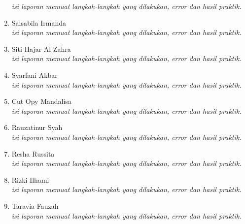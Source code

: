 \documentclass[a4paper]{tufte-handout}
\begin{document}
\begin{enumerate}
\textit{isi laporan memuat langkah-langkah yang dilakukan, error dan hasil praktik.}
\item Salsabila Irmanda		\\
\textit{isi laporan memuat langkah-langkah yang dilakukan, error dan hasil praktik.}
\item Siti Hajar Al Zahra	\\
\textit{isi laporan memuat langkah-langkah yang dilakukan, error dan hasil praktik.}
\item Syarfani Akbar		\\
\textit{isi laporan memuat langkah-langkah yang dilakukan, error dan hasil praktik.}
\item Cut Opy Mandalisa		\\
\textit{isi laporan memuat langkah-langkah yang dilakukan, error dan hasil praktik.}
\item Rauzatinur Syah		\\
\textit{isi laporan memuat langkah-langkah yang dilakukan, error dan hasil praktik.}
\item Resha Russita			\\
\textit{isi laporan memuat langkah-langkah yang dilakukan, error dan hasil praktik.}
\item Rizki Ilhami			\\
\textit{isi laporan memuat langkah-langkah yang dilakukan, error dan hasil praktik.}
\item Taravia Fauzah		\\
\textit{isi laporan memuat langkah-langkah yang dilakukan, error dan hasil praktik.}
\end{enumerate}

\hrulefill



\newpage


\end{document}
